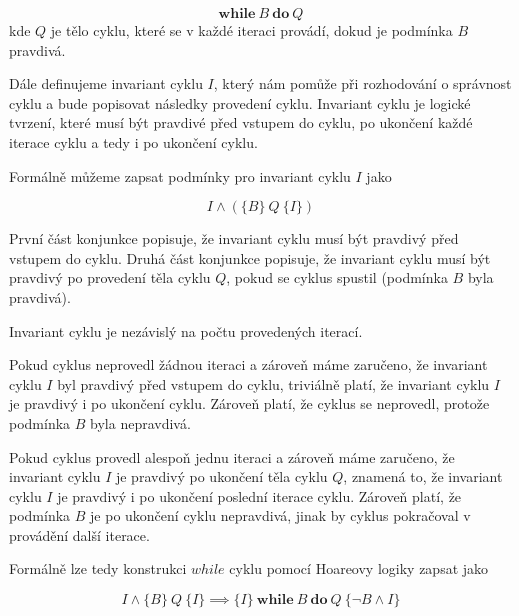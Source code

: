 \begin{equation*}
    \textbf{while} \  B \  \textbf{do} \  Q
\end{equation*}
kde $Q$ je tělo cyklu, které se v každé iteraci provádí, dokud je podmínka $B$ pravdivá.

Dále definujeme invariant cyklu $I$, který nám pomůže
při rozhodování o správnost cyklu a bude popisovat následky provedení cyklu.
Invariant cyklu je logické tvrzení, které musí být pravdivé před vstupem do cyklu,
po ukončení každé iterace cyklu a tedy i po ukončení cyklu.

Formálně můžeme zapsat podmínky pro invariant cyklu $I$ jako

\begin{equation*}
    I \land (\{ B \} \  Q \  \{ I \})
\end{equation*}

První část konjunkce popisuje, že invariant cyklu musí být pravdivý před vstupem do cyklu.
Druhá část konjunkce popisuje, že invariant cyklu musí být pravdivý po provedení těla cyklu $Q$,
pokud se cyklus spustil (podmínka $B$ byla pravdivá).

\begin{remark}
    Invariant cyklu je nezávislý na počtu provedených iterací.
\end{remark}

Pokud cyklus neprovedl žádnou iteraci a zároveň máme zaručeno,
že invariant cyklu $I$ byl pravdivý před vstupem do cyklu,
triviálně platí, že invariant cyklu $I$ je pravdivý i po ukončení cyklu.
Zároveň platí, že cyklus se neprovedl, protože podmínka $B$ byla nepravdivá.

Pokud cyklus provedl alespoň jednu iteraci a zároveň máme zaručeno,
že invariant cyklu $I$ je pravdivý po ukončení těla cyklu $Q$,
znamená to, že invariant cyklu $I$ je pravdivý i po ukončení poslední iterace cyklu.
Zároveň platí, že podmínka $B$ je po ukončení cyklu nepravdivá, jinak by cyklus pokračoval v provádění další iterace.

Formálně lze tedy konstrukci $while$ cyklu pomocí Hoareovy logiky zapsat jako

\begin{equation*}
    I \land \{ B \} \  Q \  \{ I \} \implies \{ I \} \  \textbf{while} \  B \  \textbf{do} \  Q \  \{ \neg B \land I \}
\end{equation*}
